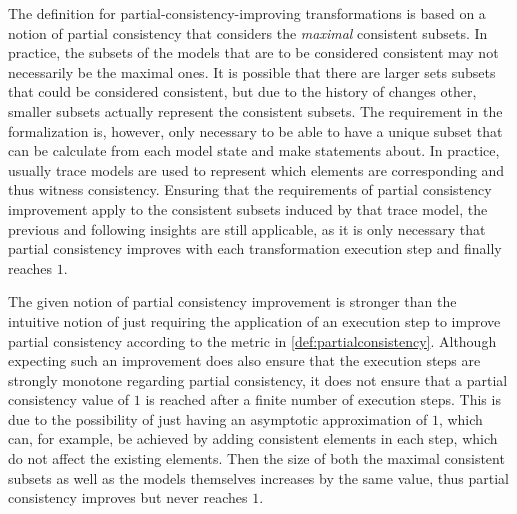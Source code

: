 \begin{remark}
    The definition for partial-consistency-improving transformations is based on a notion of partial consistency that considers the \emph{maximal} consistent subsets.
    In practice, the subsets of the models that are to be considered consistent may not necessarily be the maximal ones.
    It is possible that there are larger sets subsets that could be considered consistent, but due to the history of changes other, smaller subsets actually represent the consistent subsets.
    The requirement in the formalization is, however, only necessary to be able to have a unique subset that can be calculate from each model state and make statements about.
    In practice, usually trace models are used to represent which elements are corresponding and thus witness consistency.
    Ensuring that the requirements of partial consistency improvement apply to the consistent subsets induced by that trace model, the previous and following insights are still applicable, as it is only necessary that partial consistency improves with each transformation execution step and finally reaches $1$.
\end{remark}

The given notion of partial consistency improvement is stronger than the intuitive notion of just requiring the application of an execution step to improve partial consistency according to the metric in \autoref{def:partialconsistency}.
Although expecting such an improvement does also ensure that the execution steps are strongly monotone regarding partial consistency, it does not ensure that a partial consistency value of $1$ is reached after a finite number of execution steps.
This is due to the possibility of just having an asymptotic approximation of $1$, which can, for example, be achieved by adding consistent elements in each step, which do not affect the existing elements.
Then the size of both the maximal consistent subsets as well as the models themselves increases by the same value, thus partial consistency improves but never reaches $1$.

